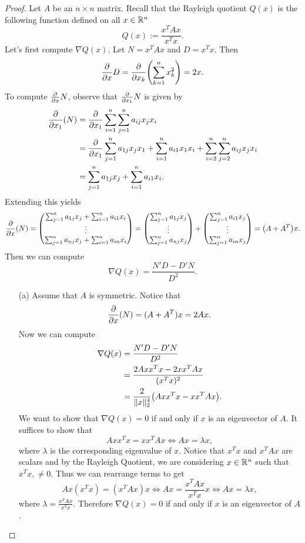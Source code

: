 \documentclass[12pt]{report}
\begin{document}
\begin{problem}
\begin{proof}
Let $A$ be an $n \times n$ matrix. Recall that the Rayleigh quotient $Q(x)$ is the following function defined on all $x \in {\mathbb R}^n$
\[
     Q(x) := \frac{x^T A x}{x^T x}.
\]
Let's first compute $\nabla Q(x)$. Let $N = x^T A x$ and $D = x^Tx$. Then
\[
     \frac{\partial }{\partial x}D = \frac{\partial }{\partial x_k}{\left(\sum_{k=1}^{n}x_k^2\right)} = 2x.
\]
To compute $\frac{\partial }{\partial x}N$, observe that $\frac{\partial }{\partial x_1}N$ is given by
\begin{align*}
    \frac{\partial }{\partial x_1}(N) &= \frac{\partial }{\partial x_1}\sum_{i=1}^n\sum_{j=1}^n a_{ij}x_jx_i\\
    &=\frac{\partial }{\partial x_1} \sum_{j=1}^n a_{1j}x_jx_1 + \sum_{i=1}^na_{i1}x_1x_i + \sum_{i=2}^n\sum_{j=2}^n a_{ij}x_jx_i\\
    &= \sum_{j=1}^n a_{1j}x_j + \sum_{i=1}^na_{i1}x_i.
\end{align*}
Extending this yields
\[
    \frac{\partial }{\partial x}(N) = \begin{pmatrix}
        \sum_{j=1}^n a_{1j}x_j + \sum_{i=1}^na_{i1}x_i \\
        \vdots\\
        \sum_{j=1}^n a_{nj}x_j + \sum_{i=1}^na_{in}x_i
    \end{pmatrix} = \begin{pmatrix}
        \sum_{j=1}^n a_{1j}x_j\\
        \vdots\\
        \sum_{j=1}^n a_{nj}x_j
    \end{pmatrix} + \begin{pmatrix}
        \sum_{j=1}^n a_{i1}x_j\\
        \vdots\\
        \sum_{j=1}^n a_{in}x_j
    \end{pmatrix} = {\left(A + A^T\right)}x.
\]
Then we can compute 
\[
     \nabla Q(x) = \frac{N'D - D'N}{D^2}.
\]



\begin{enumerate}
    \item [(a)]
    Assume that $A$ is symmetric. Notice that
    \[
         \frac{\partial }{\partial x}(N) = (A + A^T)x = 2Ax.
    \]
    Now we can compute 
    \begin{align*}
        \nabla Q(x) &= \frac{N'D - D'N}{D^2}\\
        &= \frac{2Axx^Tx - 2x x^TAx}{(x^Tx)^2}\\
        &= \frac{2}{\|x\|_2^4}{\left(Axx^Tx - xx^TAx\right)}.
    \end{align*}
    We want to show that $\nabla Q(x) = 0$ if and only if $x$ is an eigenvector of $A$. It suffices to show that
    \[
        Axx^Tx = xx^TAx  \iff Ax = \lambda x,
    \]
    where $\lambda$ is the corresponding eigenvalue of $x$. Notice that $x^Tx$ and $x^TAx$ are scalars and by the Rayleigh Quotient, we are considering $x \in {\mathbb R}^n$ such that $x^Tx,\neq 0$. Thus we can rearrange terms to get
    \[
        Ax(x^Tx) = (x^TAx)x \iff Ax = \frac{x^TAx}{x^Tx}x \iff Ax=\lambda x,
    \] 
    where $\lambda = \frac{x^TAx}{x^Tx}$. Therefore $\nabla Q(x) = 0$ if and only if $x$ is an eigenvector of $A$.


\end{enumerate}
\end{proof}
\end{problem}
\end{document}
